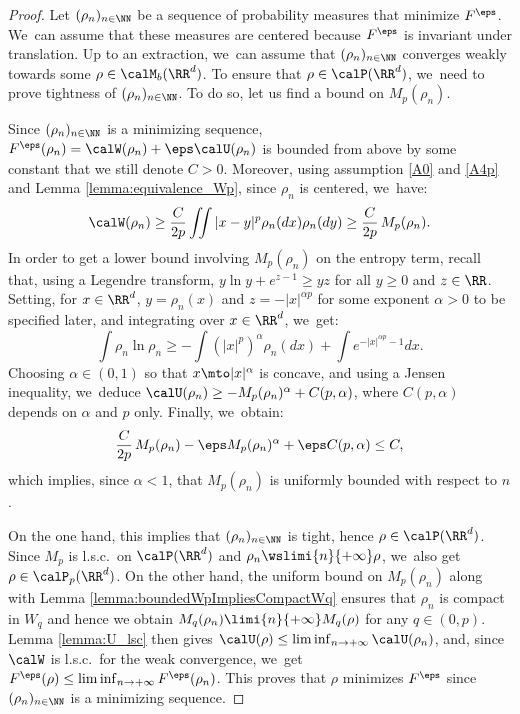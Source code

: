 \begin{proof}
Let $(\rho_n)_{n \in \NN}$ be a sequence of probability measures that minimize $F^\eps$. We~can assume that these measures are centered because $F^\eps$ is invariant under translation. Up to an extraction, we~can assume that $(\rho_n)_{n \in \NN}$ converges weakly towards some $\rho \in \calM_b(\RR^d)$. To ensure that $\rho \in \calP(\RR^d)$, we~need to prove tightness of $(\rho_n)_{n \in \NN}$. To do so, let us find a bound on $M_p(\rho_n)$.

Since $(\rho_n)_{n \in \NN}$ is a minimizing sequence, $F^\eps(\rho_n) = \calW(\rho_n) + \eps \calU(\rho_n)$ is bounded from above by some constant that we still denote $C>0$. Moreover, using assumption \eqref{A0} and \eqref{A4p} and Lemma \ref{lemma:equivalence_Wp}, since $\rho_n$ is centered, we~have:
\[
\calW(\rho_n) \geq \frac{C}{2p} \iint |x-y|^p \rho_n(dx) \rho_n(dy) \geq \frac{C}{2p}\, M_p(\rho_n).
\]
In order to get a lower bound involving $M_p(\rho_n)$ on the entropy term, recall that, using a Legendre transform, $y\ln y + e^{z-1} \geq yz$ for all $y \geq 0$ and $z \in \RR$. Setting, for $x \in \RR^d$, $y = \rho_n(x)$ and $z = -|x|^{\alpha p}$ for some exponent $\alpha > 0$ to be specified later, and integrating over $x \in \RR^d$, we~get:
\[
\int \rho_n \ln \rho_n \geq - \int (|x|^p)^\alpha \rho_n(dx) + \int e^{-|x|^{\alpha p} -1} dx.
\]
Choosing $\alpha \in (0,1)$ so that $x \mto |x|^\alpha$ is concave, and using a Jensen inequality, we~deduce $\calU(\rho_n) \geq - M_p(\rho_n)^\alpha + C(p,\alpha)$, where $C(p,\alpha)$ depends on $\alpha$ and $p$ only. Finally, we~obtain:
\[
\frac{C}{2p}\, M_p(\rho_n) - \eps M_p(\rho_n)^\alpha + \eps C(p,\alpha) \leq C,
\]
which implies, since $\alpha < 1$, that $M_p(\rho_n)$ is uniformly bounded with respect to $n$.

On the one hand, this implies that $(\rho_n)_{n \in \NN}$ is tight, hence $\rho \in \calP(\RR^d)$. Since $M_p$ is l.s.c.\ on $\calP(\RR^d)$ and $\rho_n \wslimi{n}{+\infty} \rho$, we~also get $\rho \in\calP_p(\RR^d)$. On the other hand, the uniform bound on $M_p(\rho_n)$ along with Lemma \ref{lemma:boundedWpImpliesCompactWq} ensures that $\rho_n$ is compact in $W_q$ and hence we obtain $M_q(\rho_n) \limi{n}{+\infty} M_q(\rho)$ for any $q \in (0,p)$. Lemma \ref{lemma:U_lsc} then gives $\calU(\rho) \leq \liminf_{n \to +\infty} \calU(\rho_n)$, and, since $\calW$ is l.s.c.\ for the weak convergence, we~get $F^\eps(\rho) \leq \liminf_{n \to +\infty} F^\eps(\rho_n)$. This proves that $\rho$ minimizes $F^\eps$ since $(\rho_n)_{n \in \NN}$ is a minimizing sequence.
\end{proof}

